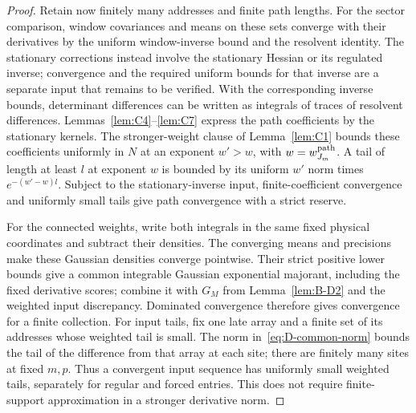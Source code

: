 \begin{proof}
Retain now finitely many addresses and finite path lengths. For the sector comparison, window covariances and means on these sets converge with their derivatives by the uniform window-inverse bound and the resolvent identity. The stationary corrections instead involve the stationary Hessian or its regulated inverse; convergence and the required uniform bounds for that inverse are a separate input that remains to be verified. With the corresponding inverse bounds, determinant differences can be written as integrals of traces of resolvent differences. Lemmas~\ref{lem:C4}--\ref{lem:C7} express the path coefficients by the stationary kernels. The stronger-weight clause of Lemma~\ref{lem:C1} bounds these coefficients uniformly in $N$ at an exponent $w'>w$, with $w=w_{J_m}^{\rm path}$. A tail of length at least $l$ at exponent $w$ is bounded by its uniform $w'$ norm times $e^{-(w'-w)l}$. Subject to the stationary-inverse input, finite-coefficient convergence and uniformly small tails give path convergence with a strict reserve.

For the connected weights, write both integrals in the same fixed physical coordinates and subtract their densities. The converging means and precisions make these Gaussian densities converge pointwise. Their strict positive lower bounds give a common integrable Gaussian exponential majorant, including the fixed derivative scores; combine it with $G_M$ from Lemma~\ref{lem:B-D2} and the weighted input discrepancy. Dominated convergence therefore gives convergence for a finite collection. For input tails, fix one late array and a finite set of its addresses whose weighted tail is small. The norm in~\eqref{eq:D-common-norm} bounds the tail of the difference from that array at each site; there are finitely many sites at fixed $m,p$. Thus a convergent input sequence has uniformly small weighted tails, separately for regular and forced entries. This does not require finite-support approximation in a stronger derivative norm.


\end{proof}
